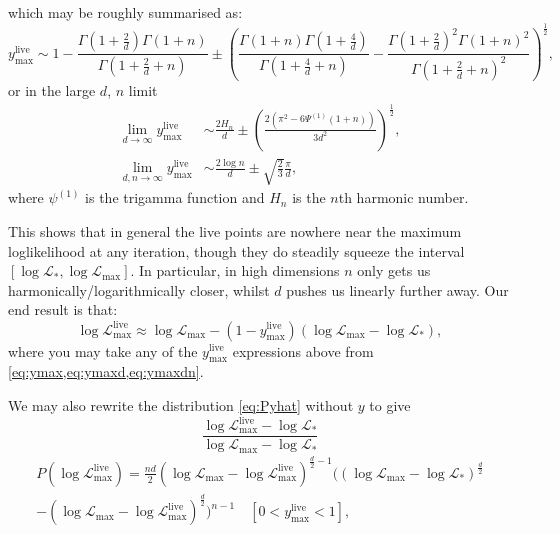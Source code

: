 \documentclass[usenatbib]{mnras} %
\begin{document}
which may be roughly summarised as:
\begin{equation}
    y_\mathrm{max}^\mathrm{live} \sim 1-\frac{\Gamma(1+\frac{2}{d})\Gamma(1+n)}{\Gamma(1+\frac{2}{d}+n)} \pm \left( \frac{\Gamma(1+n)\Gamma(1+\frac{4}{d})}{\Gamma(1+\frac{4}{d}+n)} - \frac{\Gamma(1+\frac{2}{d})^2 \Gamma(1+n)^2}{\Gamma(1+\frac{2}{d}+n)^2}\right)^{\frac{1}{2}},
    \label{eq:ymax}
\end{equation}
or in the large $d$, $n$ limit
\begin{align}
    \lim_{d\to\infty} y_\mathrm{max}^\mathrm{live} &\sim \frac{2H_n}{d} \pm \left(\frac{2(\pi^2 - 6\Psi^{(1)}(1+n))}{3d^2}\right)^{\frac{1}{2}},
    \label{eq:ymaxd}\\
    \lim_{d,n\to\infty} y_\mathrm{max}^\mathrm{live} &\sim \frac{2\log n}{d} \pm \sqrt{\frac{2}{3}}\frac{\pi}{d},
    \label{eq:ymaxdn}
\end{align}
where $\psi^{(1)}$ is the trigamma function and $H_n$ is the $n$th harmonic number.

This shows that in general the live points are nowhere near the maximum loglikelihood at any iteration, though they do steadily squeeze the interval $[\log\mathcal{L}_*,\log\mathcal{L}_\mathrm{max}]$. In particular, in high dimensions $n$ only gets us harmonically/logarithmically closer, whilst $d$ pushes us linearly further away. Our end result is that:
\begin{equation}
    \boxed{
        \log{\mathcal{L}}_\mathrm{max}^\mathrm{live} \approx \log\mathcal{L}_\mathrm{max} - (1-y_\mathrm{max}^\mathrm{live})(\log\mathcal{L}_\mathrm{max}-\log\mathcal{L}_*)
    },
\end{equation}
where you may take any of the $y_\mathrm{max}^\mathrm{live}$ expressions above from \cref{eq:ymax,eq:ymaxd,eq:ymaxdn}.

We may also rewrite the distribution \cref{eq:Pyhat} without $y$ to give
\begin{equation}
    \frac{\log\mathcal{L}_\mathrm{max}^\mathrm{live}-\log\mathcal{L}_*}{\log\mathcal{L}_\mathrm{max}-\log\mathcal{L}_*}
\end{equation}
\begin{multline}
	P(\log\mathcal{L}_\mathrm{max}^\mathrm{live}) = \frac{nd}{2}(\log\mathcal{L}_\mathrm{max} - \log\mathcal{L}_\mathrm{max}^\mathrm{live})^{\frac{d}{2}-1}\Big( (\log\mathcal{L}_\mathrm{max}-\log\mathcal{L}_*)^{\frac{d}{2}}\\
	-(\log\mathcal{L}_\mathrm{max} - \log\mathcal{L}_\mathrm{max}^\mathrm{live})^{\frac{d}{2}} \Big)^{n-1} \quad [0<y_\mathrm{max}^\mathrm{live}<1],
\end{multline}
\end{document}
